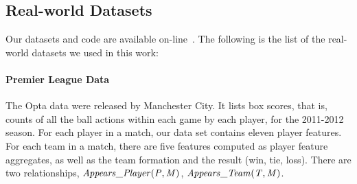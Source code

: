 {%
	
		

\subsection{Real-world Datasets}\label{sec:real}  Our datasets and code are available on-line~\cite{url}. The following is the list of the real-world datasets we used in this work:
				\paragraph{Premier League Data} 
				The Opta data were released by Manchester City. 
				It lists box scores, that is, counts of all the ball actions within each game by each player, for the 2011-2012 season. 
				For each player in a match, our data set contains eleven player features.
				For each team in a match, there are five features computed as player feature aggregates, as well as the team formation and the result (win, tie, loss). 
				There are two relationships, $\it{Appears\_Player}(P,M)$, $\it{Appears\_Team}(T,M)$. 
				
}
